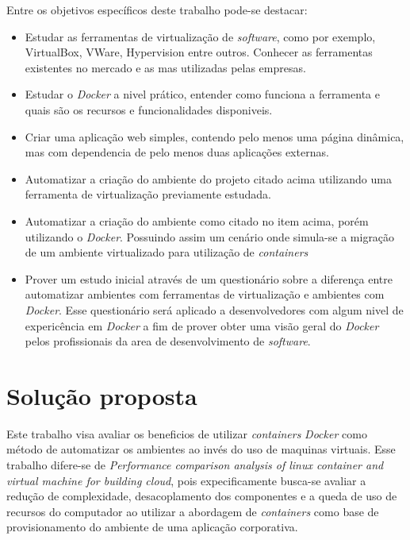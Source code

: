 \documentclass[11pt,a4paper]{article}
\begin{document}
Entre os objetivos específicos deste trabalho pode-se destacar:

\begin{itemize}
  \item Estudar as ferramentas de virtualização de \textit{software}, como por exemplo,
    VirtualBox, VWare, Hypervision entre outros. Conhecer as ferramentas existentes no mercado e as
    mas utilizadas pelas empresas.
  \item Estudar o \textit{Docker} a nivel prático, entender como funciona a ferramenta e quais são os
    recursos e funcionalidades disponiveis.
  \item Criar uma aplicação web simples, contendo pelo menos uma página dinâmica, mas com dependencia
    de pelo menos duas aplicações externas.
  \item Automatizar a criação do ambiente do projeto citado acima utilizando uma ferramenta de virtualização
    previamente estudada.
  \item Automatizar a criação do ambiente como citado no item acima, porém utilizando o \textit{Docker}. Possuindo
    assim um cenário onde simula-se a migração de um ambiente virtualizado para utilização de \textit{containers}
  \item Prover um estudo inicial através de um questionário sobre a diferença entre automatizar
    ambientes com ferramentas de virtualização e ambientes com \textit{Docker}. Esse questionário será aplicado
    a desenvolvedores com algum nivel de expericência em \textit{Docker} a fim de prover obter uma visão geral
    do \textit{Docker} pelos profissionais da area de desenvolvimento de \textit{software}.
\end{itemize}

\section{Solução proposta}

Este trabalho visa avaliar os beneficios de utilizar \textit{containers} \textit{Docker} como método de automatizar
os ambientes ao invés do uso de maquinas virtuais. Esse trabalho difere-se de \textit{Performance comparison
analysis of linux container and virtual machine for building cloud}\cite{Performance_container_vm}, pois expecificamente
busca-se avaliar a redução de complexidade, desacoplamento dos componentes e a queda de uso de recursos do computador
ao utilizar a abordagem de \textit{containers} como base de provisionamento do ambiente de uma aplicação corporativa.
\end{document}
